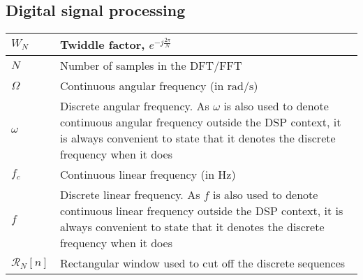 \documentclass{article}
\begin{document}
\subsection{Digital signal processing}
\begin{xltabular}{\textwidth}{XX}
	\(W_N\)                                                                                         & Twiddle factor, \(e^{-j\frac{2\pi}{N}}\) \cite{ingleDigitalSignalProcessing2000}                                                                                                                            \\ \hline
	\(N\)                                                                                           & Number of samples in the DFT/FFT                                                                                                                                                                            \\ \hline
	\(\Omega\) \cite{ingleDigitalSignalProcessing2000}                                              & Continuous angular frequency (in \(\si{\radian\per\second}\))                                                                                                                                               \\ \hline
	\(\omega\)                                                                                      & Discrete angular frequency. As \(\omega\) is also used to denote continuous angular frequency outside the DSP context, it is always convenient to state that it denotes the discrete frequency when it does \\ \hline
	\(f_c\)                                                                                         & Continuous linear frequency (in \(\si{\hertz}\))                                                                                                                                                            \\ \hline
	\(f\)                                                                                           & Discrete linear frequency. As \(f\) is also used to denote continuous linear frequency outside the DSP context, it is always convenient to state that it denotes the discrete frequency when it does        \\ \hline
	\(\mathcal{R}_N [n]\)                                                                           & Rectangular window used to cut off the discrete sequences \cite{ingleDigitalSignalProcessing2000}                                                                                                           \\ \hline

\end{xltabular}
\end{document}
